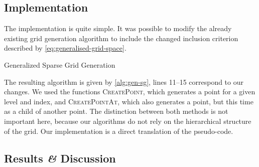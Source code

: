 \subsection{Implementation}
The implementation is quite simple.
It was possible to modify the already existing grid generation algorithm to include the changed inclusion criterion described by \cref{eq:generalised-grid-space}.
\begin{algorithm}[h]
 \caption{Generalized Sparse Grid Generation}\label{alg:gen-sg} 
 \begin{algorithmic}[1]
   \Statex
   \State{}
   \EndFor
     \State{} 
   \EndFor
   \State{}
   \EndIf
   \State{}
   \EndFor
   \EndWhile
   
   \EndFor
   \EndFor
   \EndFunction
 \end{algorithmic}
\end{algorithm}
The resulting algorithm is given by \cref{alg:gen-sg}, lines 11--15 correspond to our changes.
We used the functions \textsc{CreatePoint}, which generates a point for a given
level and index, and \textsc{CreatePointAt}, which also generates a point, but
this time as a child of another point.
The distinction between both methods is not important here, because our algorithms do not rely on the hierarchical structure of the grid.
Our implementation is a direct translation of the pseudo-code.
\subsection{Results \textit{\&} Discussion}
\newenvironment{ttable}{
  \begin{tabular}[c]{S[table-format=2.1]
    S[table-format=1.4, table-figures-exponent=2, table-sign-mantissa, table-sign-exponent]
    S[table-format=4.1(4)]
    S[table-format=2.1]
    S[table-format=4.0]
    S[table-format=2.3]
    S[table-format=2.3]}
  \toprule \multicolumn{1}{c}{\(T\)}
& \multicolumn{1}{c}{\(\lambda\)}
& \multicolumn{1}{c}{\textsc{cv}-Grid}
& \multicolumn{1}{c}{\textsc{cv-rmse}}
& \multicolumn{1}{c}{Train-Grid}
& \multicolumn{1}{c}{Train-\textsc{rmse}}
& \multicolumn{1}{r}{Test-\textsc{rmse}}
\\\midrule}{\bottomrule\end{tabular}}

